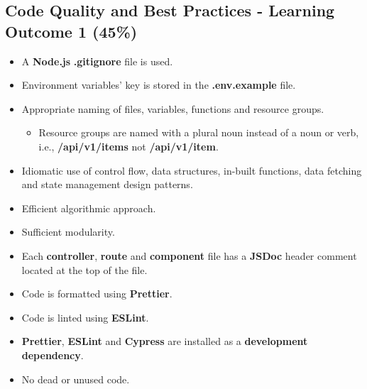 \documentclass{article}
\begin{document}
\subsection*{Code Quality and Best Practices - Learning Outcome 1 (45\%)}
\begin{itemize}
	\item A \textbf{Node.js} \textbf{.gitignore} file is used.
	\item Environment variables' key is stored in the \textbf{.env.example} file. 
  	\item Appropriate naming of files, variables, functions and resource groups.
  \begin{itemize}
	\item Resource groups are named with a plural noun instead of a noun or verb, i.e., \textbf{/api/v1/items} not \textbf{/api/v1/item}.
  \end{itemize}
	\item Idiomatic use of control flow, data structures, in-built functions, data fetching and state management design patterns.
  \item Efficient algorithmic approach.
  \item Sufficient modularity.
  \item Each \textbf{controller}, \textbf{route} and \textbf{component} file has a \textbf{JSDoc} header comment located at the top of the file.
  \item Code is formatted using \textbf{Prettier}.
  \item Code is linted using \textbf{ESLint}.
  \item \textbf{Prettier}, \textbf{ESLint} and \textbf{Cypress} are installed as a \textbf{development dependency}.	
\item No dead or unused code. 
\end{itemize}
\end{document}
